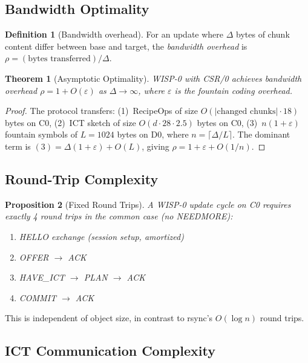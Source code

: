 \documentclass[11pt,twocolumn]{article}
\newtheorem{theorem}{Theorem}
\newtheorem{proposition}[theorem]{Proposition}
\theoremstyle{definition}
\newtheorem{definition}{Definition}
\begin{document}
\subsection{Bandwidth Optimality}

\begin{definition}[Bandwidth overhead]
For an update where $\Delta$ bytes of chunk content differ between base
and target, the \emph{bandwidth overhead} is
$\rho = (\text{bytes transferred}) / \Delta$.
\end{definition}

\begin{theorem}[Asymptotic Optimality]
\label{thm:bandwidth}
WISP-0 with CSR/0 achieves bandwidth overhead
$\rho = 1 + O(\varepsilon)$ as $\Delta \to \infty$, where $\varepsilon$
is the fountain coding overhead.
\end{theorem}

\begin{proof}
The protocol transfers: (1)~RecipeOps of size
$O(|\text{changed chunks}| \cdot 18)$ bytes on C0, (2)~ICT sketch of
size $O(d \cdot 28 \cdot 2.5)$ bytes on C0, (3)~$n(1+\varepsilon)$
fountain symbols of $L = 1024$ bytes on D0, where
$n = \lceil \Delta / L \rceil$. The dominant term is
$(3) = \Delta(1 + \varepsilon) + O(L)$, giving
$\rho = 1 + \varepsilon + O(1/n)$.
\end{proof}

\subsection{Round-Trip Complexity}

\begin{proposition}[Fixed Round Trips]
A WISP-0 update cycle on C0 requires exactly 4 round trips in the
common case (no NEEDMORE):
\begin{enumerate}
  \item HELLO exchange (session setup, amortized)
  \item OFFER $\to$ ACK
  \item HAVE\_ICT $\to$ PLAN $\to$ ACK
  \item COMMIT $\to$ ACK
\end{enumerate}
\end{proposition}

This is independent of object size, in contrast to rsync's
$O(\log n)$ round trips.

\subsection{ICT Communication Complexity}
\end{document}
